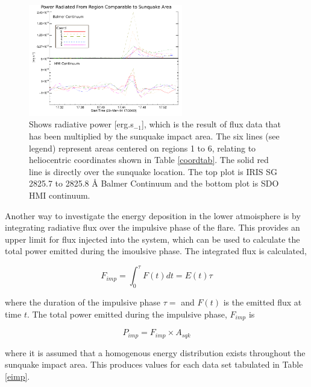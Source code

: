 \begin{figure}[H]
  \begin{center}
  \includegraphics[width=0.6\textwidth]{29-Mar-14-A_sqk-Power-Ladder-Balm-HMI-Only}
  \end{center}
  \caption{Shows radiative power [erg.s$_{-1}$], which is the result of flux data that has been multiplied by the sunquake impact area. The six lines (see legend) represent areas centered on regions 1 to 6, relating to heliocentric coordinates shown in Table \ref{coordtab}. The solid red line is directly over the sunquake location. The top plot is IRIS SG  2825.7 to 2825.8 Å Balmer Continuum and the bottom plot is SDO HMI continuum.}\label{powerladder-balm-hmi-only}
\end{figure}


Another way to investigate the energy deposition in the lower atmoisphere is by integrating radiative flux over the impulsive phase of the flare. This provides an upper limit for flux injected into the system, which can be used to calculate the total power emitted during the imoulsive phase. The integrated flux is calculated,

\begin{equation}
F_{imp} = \int_{0}^{\tau} F(t) dt = E(t) \tau
\end{equation}\label{f-imp}
 
where the duration of the impulsive phase $\tau = $ and $F(t)$ is the emitted flux at time $t$. The total power emitted during the impulsive phase, $F_{imp}$ is

\begin{equation}
P_{imp}=F_{imp}{\times}A_{sqk}
\end{equation}\label{e-imp}

where it is assumed that a homogenous energy distribution exists throughout the sunquake impact area. This produces values for each data set tabulated in Table \ref{eimp}. 

